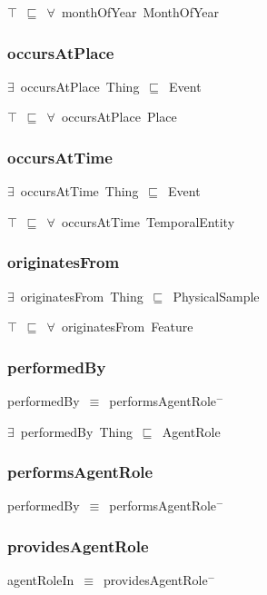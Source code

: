 \documentclass{article}
\begin{document}
\ensuremath{\top}~\ensuremath{\sqsubseteq}~\ensuremath{\forall}~monthOfYear~MonthOfYear

\subsubsection*{occursAtPlace}

\ensuremath{\exists}~occursAtPlace~Thing~\ensuremath{\sqsubseteq}~Event

\ensuremath{\top}~\ensuremath{\sqsubseteq}~\ensuremath{\forall}~occursAtPlace~Place

\subsubsection*{occursAtTime}

\ensuremath{\exists}~occursAtTime~Thing~\ensuremath{\sqsubseteq}~Event

\ensuremath{\top}~\ensuremath{\sqsubseteq}~\ensuremath{\forall}~occursAtTime~TemporalEntity

\subsubsection*{originatesFrom}

\ensuremath{\exists}~originatesFrom~Thing~\ensuremath{\sqsubseteq}~PhysicalSample

\ensuremath{\top}~\ensuremath{\sqsubseteq}~\ensuremath{\forall}~originatesFrom~Feature

\subsubsection*{performedBy}

performedBy~\ensuremath{\equiv}~performsAgentRole\ensuremath{^-}

\ensuremath{\exists}~performedBy~Thing~\ensuremath{\sqsubseteq}~AgentRole

\subsubsection*{performsAgentRole}

performedBy~\ensuremath{\equiv}~performsAgentRole\ensuremath{^-}

\subsubsection*{providesAgentRole}

agentRoleIn~\ensuremath{\equiv}~providesAgentRole\ensuremath{^-}
\end{document}
